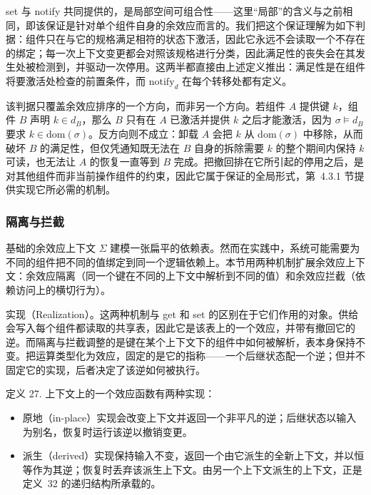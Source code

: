 \documentclass[
  10
]{article}
\begin{document}
set 与 notify 共同提供的，是局部空间可组合性——这里“局部”的含义与之前相同，即该保证是针对单个组件自身的余效应而言的。我们把这个保证理解为如下判据：组件只在与它的规格满足相符的状态下激活，因此它永远不会读取一个不存在的绑定；每一次上下文变更都会对照该规格进行分类，因此满足性的丧失会在其发生处被检测到，并驱动一次停用。这两半都直接由上述定义推出：满足性是在组件将要激活处检查的前置条件，而 \(\mathrm { n o t i f y } _ { d }\) 在每个转移处都有定义。

该判据只覆盖余效应排序的一个方向，而非另一个方向。若组件 \(A\) 提供键 \(k\)，组件 \(B\) 声明 \(k \in d _ { B }\)，那么 \(B\) 只有在 \(A\) 已激活并提供 \(k\) 之后才能激活，因为 \(\sigma \models d _ { B }\) 要求 \(k \in \mathrm { d o m } ( \sigma )\)。反方向则不成立：卸载 \(A\) 会把 \(k\) 从 dom\(( \sigma )\) 中移除，从而破坏 \(B\) 的满足性，但仅凭通知既无法在 \(B\) 自身的拆除需要 \(k\) 的整个期间内保持 \(k\) 可读，也无法让 \(A\) 的恢复一直等到 \(B\) 完成。把撤回排在它所引起的停用之后，是对其他组件而非当前操作组件的约束，因此它属于保证的全局形式，第~4.3.1 节提供实现它所必需的机制。

\subsubsection{隔离与拦截} \label{isolation-and-interception}

基础的余效应上下文 \(\Sigma\) 建模一张扁平的依赖表。然而在实践中，系统可能需要为不同的组件把不同的值绑定到同一个逻辑依赖上。本节用两种机制扩展余效应上下文：余效应隔离（同一个键在不同的上下文中解析到不同的值）和余效应拦截（依赖访问上的横切行为）。

实现（Realization）。这两种机制与 get 和 set 的区别在于它们作用的对象。供给会写入每个组件都读取的共享表，因此它是该表上的一个效应，并带有撤回它的逆。而隔离与拦截调整的是键在某个上下文下的组件中如何被解析，表本身保持不变。把运算类型化为效应，固定的是它的指称——一个后继状态配一个逆；但并不固定它的实现，后者决定了该逆如何被执行。

定义 27. 上下文上的一个效应函数有两种实现：

\begin{itemize}
\item 原地（in-place）实现会改变上下文并返回一个非平凡的逆；后继状态以输入为别名，恢复时运行该逆以撤销变更。
\item 派生（derived）实现保持输入不变，返回一个由它派生的全新上下文，并以恒等作为其逆；恢复时丢弃该派生上下文。由另一个上下文派生的上下文，正是定义~32 的递归结构所承载的。
\end{itemize}
\end{document}
